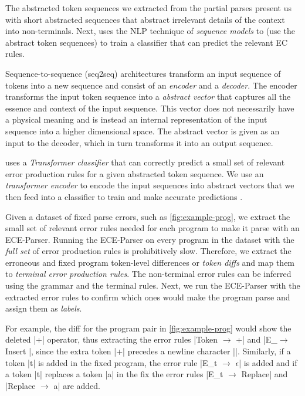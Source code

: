 The abstracted token sequences we extracted from
the partial parses present us with short abstracted
sequences that abstract irrelevant details of the context
into non-terminals.
%
Next, \toolname uses the NLP technique of
\emph{sequence models} \citep{Sutskever_2014, Hardalov_2018}
to (use the abstract token sequences) to train
a classifier that can predict the relevant EC rules.

%
Sequence-to-sequence (seq2seq) architectures
transform an input sequence of tokens into a
new sequence \citep{Sutskever_2014} and consist
of an \emph{encoder} and a \emph{decoder}.
%
The encoder transforms the input token sequence
into a \emph{abstract vector} that captures all
the essence and context of the input sequence.
%
This vector does not necessarily have a physical
meaning and is instead an internal representation
of the input sequence into a higher dimensional space.
The abstract vector is given as an input to the decoder,
which in turn transforms it into an output sequence.


\toolname uses a \emph{Transformer classifier}
that can correctly predict a small set of relevant
error production rules for a given abstracted token sequence.
We use an \emph{transformer encoder} to encode
the input sequences into abstract vectors that
we then feed into a \emph{\dnn} classifier to
train and make accurate predictions \citep{Schmidhuber_2015}.

%
Given a dataset of fixed parse errors,
such as \autoref{fig:example-prog}, we
extract the small set of relevant error
rules needed for each program to make it parse
with an ECE-Parser.
%
Running the ECE-Parser on every program
in the dataset with the \emph{full set}
of error production rules is prohibitively
slow.
%
Therefore, we extract the erroneous and
fixed program token-level differences or
\emph{token diffs} and map them to
\emph{terminal error production rules}.
%
The non-terminal error rules can be
inferred using the grammar and the terminal
rules. Next, we run the ECE-Parser with
the extracted error rules to confirm which
ones would make the program parse and assign them as
\emph{labels}.

For example, the diff for the program pair in
\autoref{fig:example-prog} would show the
deleted |+| operator, thus extracting
the error rules |Token $\rightarrow$ +|
and |E_\n $\rightarrow$ Insert \n|,
since the extra token |+| precedes
a newline character |\n|.
%
Similarly, if a token |t| is added in
the fixed program, the error rule
%
|E_t $\rightarrow$ $\epsilon$| is
added and if a token |t| replaces
a token |a| in the fix the error
rules |E_t $\rightarrow$ Replace| and
%
|Replace $\rightarrow$ a| are added.

